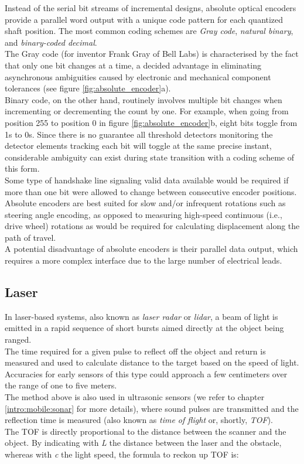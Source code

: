 Instead of the serial bit streams of incremental designs, absolute optical
encoders provide a parallel word output with a unique code pattern for each
quantized shaft position. The most common coding schemes are \textit{Gray code},
\textit{natural binary}, and \textit{binary-coded decimal}.
\\
The Gray code (for inventor Frank Gray of Bell Labs) is characterised by the
fact that only one bit changes at a time, a decided advantage in eliminating
asynchronous ambiguities caused by electronic and mechanical component tolerances
(see figure \ref{fig:absolute_encoder}a).
\\
Binary code, on the other hand, routinely involves multiple bit changes when
incrementing or decrementing the count by one. For example, when going from
position 255 to position 0 in figure \ref{fig:absolute_encoder}b, eight
bits toggle from 1s to 0s. Since
there is no guarantee all threshold detectors monitoring the detector elements
tracking each bit will toggle at the same precise instant, considerable ambiguity
can exist during state transition with a coding scheme of this form.
\\
Some type of handshake line signaling valid data available would be required
if more than one bit were allowed to change between consecutive encoder positions.
\\
Absolute encoders are best suited for slow and/or infrequent rotations such
as steering angle encoding, as opposed to measuring high-speed continuous
(i.e., drive wheel) rotations as would be required for calculating displacement
along the path of travel.
\\
A potential disadvantage of absolute encoders is their parallel data output,
which requires a more complex interface due to the large number of electrical leads.


\subsection{Laser}
\label{intro:mobile:laser}

In laser-based systems, also known as \textit{laser radar} or
\textit{lidar}, a beam of light is emitted in a rapid sequence
of short bursts aimed directly at the object being ranged.
\\
The time required for a given pulse to reflect off the object
and return is measured and used to calculate distance to the
target based on the speed of light. Accuracies for early sensors
of this type could approach a few centimeters over the range
of one to five meters.
\\
The method above is also used in ultrasonic sensors (we refer to
chapter \ref{intro:mobile:sonar} for more details), where sound pulses
are transmitted and the reflection time is measured (also known as
\textit{time of flight} or, shortly, \textit{TOF}).
\\
The TOF is directly proportional to the distance between the scanner
and the object. By indicating with \textit{L} the distance between
the laser and the obstacle, whereas with \textit{c} the light speed,
the formula to reckon up TOF is:

